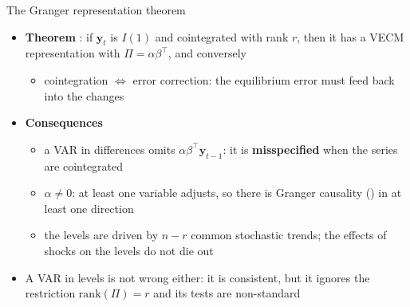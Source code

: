 \begin{frame}{The Granger representation theorem}
\itemsize{\small}
\begin{itemize}
    \item \textbf{Theorem} : if $\mathbf y_t$ is $I(1)$ and cointegrated with rank $r$, then it has a VECM representation with $\Pi = \alpha\beta^\top$, and conversely
    \begin{itemize}
        \item cointegration $\Leftrightarrow$ error correction: the equilibrium error must feed back into the changes
    \end{itemize}
    \item \textbf{Consequences}
    \begin{itemize}
        \item a VAR in differences omits $\alpha\beta^\top\mathbf y_{t-1}$: it is \textbf{misspecified} when the series are cointegrated
        \item $\alpha \neq 0$: at least one variable adjusts, so there is Granger causality () in at least one direction
        \item the levels are driven by $n - r$ common stochastic trends; the effects of shocks on the levels do not die out
    \end{itemize}
    \item A VAR in levels is not wrong either: it is consistent, but it ignores the restriction $\mathrm{rank}(\Pi) = r$ and its tests are non-standard
\end{itemize}
\end{frame}

